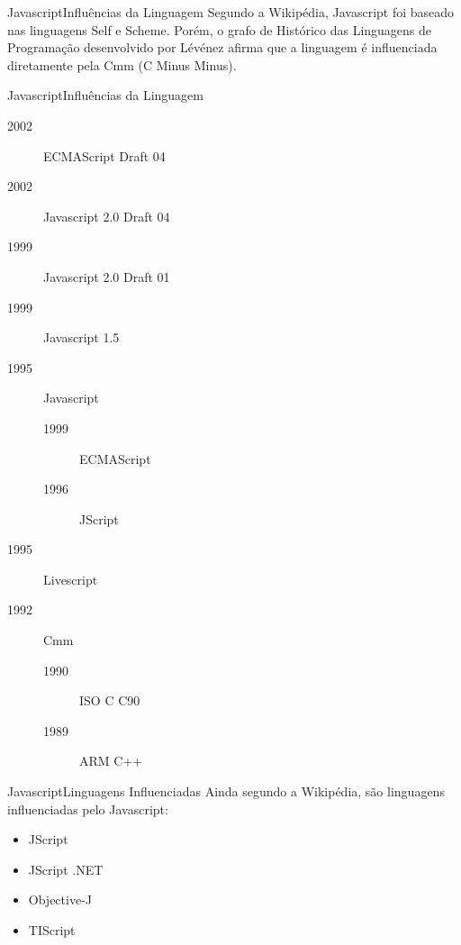 \documentclass[hyperref={pdfpagelabels=false}]{beamer}
\begin{document}
\begin{frame}{Javascript}{Influências da Linguagem}
    Segundo a Wikipédia\cite{wikipedia}, Javascript foi baseado nas linguagens
    Self e Scheme. Porém, o grafo de Histórico das Linguagens de Programação
    desenvolvido por Lévénez\cite{plotter} afirma que a linguagem é influenciada
    diretamente pela Cmm (C Minus Minus\cite{cmm}).
\end{frame}

\begin{frame}{Javascript}{Influências da Linguagem}
    \begin{description}
    \item[2002] ECMAScript Draft 04
    \item[2002] Javascript 2.0 Draft 04
    \item[1999] Javascript 2.0 Draft 01
    \item[1999] Javascript 1.5
    \item[1995] Javascript
        \begin{description}
        \item[1999] ECMAScript
        \item[1996] JScript
        \end{description}
    \item[1995] Livescript
    \item[1992] Cmm
        \begin{description}
        \item[1990] ISO C C90
        \item[1989] ARM C++
        \end{description}
    \end{description}
\end{frame}

\begin{frame}{Javascript}{Linguagens Influenciadas}
    Ainda segundo a Wikipédia\cite{wikipedia}, são linguagens influenciadas pelo
    Javascript:
    \begin{itemize}
        \item JScript
        \item JScript .NET
        \item Objective-J
        \item TIScript
    \end{itemize}
\end{frame}

\begin{frame}
    
    
\end{frame}
\end{document}
